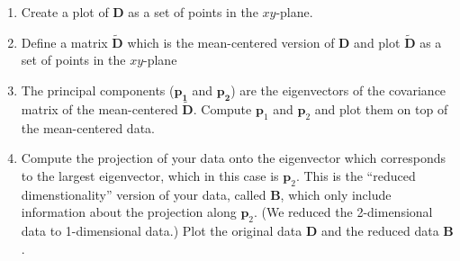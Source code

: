 \begin{prob}
\begin{enumerate}
\item Create a plot of $\mathbf{D}$ as a set of points in the $xy$-plane.
\item Define a matrix $\tilde{\mathbf{D}}$ which is the mean-centered version of $\mathbf{D}$ and plot $\tilde{\mathbf{D}}$ as a set of points in the $xy$-plane
\item The principal components ($\mathbf{p_{1}}$ and $\mathbf{p_2}$) are the eigenvectors of the covariance matrix of the mean-centered $\tilde{\mathbf{D}}$. Compute $\mathbf{p}_1$ and $\mathbf{p}_2$ and plot them on top of the mean-centered data.
\item Compute the projection of your data onto the eigenvector which corresponds to the largest eigenvector, which in this case is $\mathbf{p}_2$. This is the ``reduced dimenstionality'' version of your data, called $\mathbf{B}$, which only include information about the projection along $\mathbf{p}_2$. (We reduced the 2-dimensional data to 1-dimensional data.) Plot the original data $\mathbf{D}$ and the reduced data $\mathbf{B}$.
\end{enumerate}
\end{prob}

